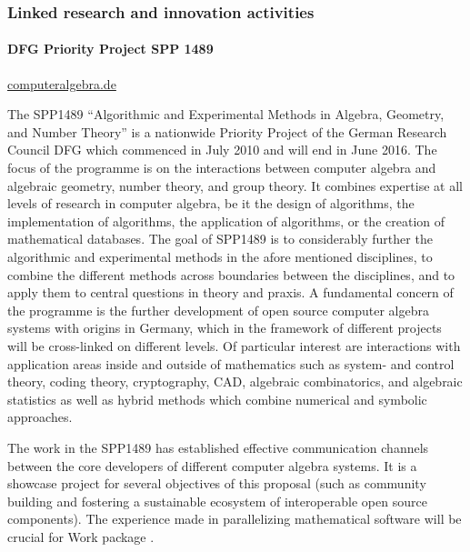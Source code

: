 \subsubsection{Linked research and innovation activities}\label{linked-projects}



\paragraph{DFG Priority Project SPP 1489}
\url{computeralgebra.de}

The SPP1489 ``Algorithmic and Experimental Methods in Algebra, Geometry, and
Number Theory'' is a nationwide Priority Project of the German Research Council DFG
which commenced in July  2010 and will end in June 2016. The focus of the programme
is on the interactions between computer algebra and algebraic geometry, number theory,
and group theory. It combines expertise at all levels of research in computer algebra,
be it the design of algorithms, the implementation of algorithms, the application
of algorithms, or the creation of mathematical databases. The goal of SPP1489 is to
considerably further the algorithmic and experimental methods in the afore mentioned
disciplines, to combine the different methods across boundaries between the disciplines,
and to apply them to central questions in theory and praxis. A fundamental concern of the
programme is the further development of open source
computer algebra systems with origins in Germany, which in
the framework of different projects will be cross-linked on
different levels. Of particular interest are interactions with application areas inside
and outside of mathematics such as system- and control theory, coding
theory, cryptography, CAD, algebraic combinatorics, and algebraic
statistics as well as hybrid methods which combine numerical and
symbolic approaches.

The work in the SPP1489 has established effective communication channels between the core
developers of different computer algebra systems. It is a showcase project for several
objectives of this proposal (such as community building and fostering a sustainable
ecosystem of interoperable open source components).  The experience made in parallelizing
mathematical software will be crucial for Work package .


